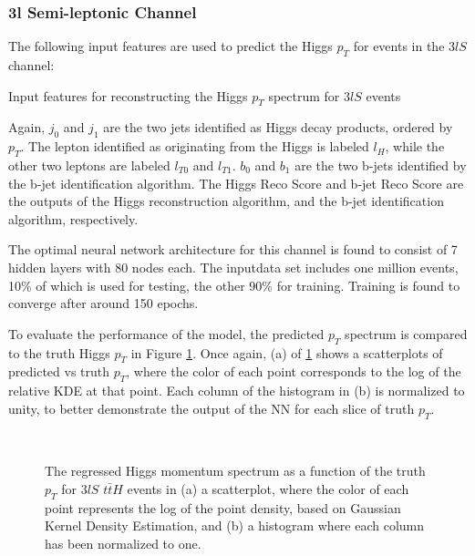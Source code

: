 
\subsubsection{3l Semi-leptonic Channel}
\label{subsec:pt3lS}

The following input features are used to predict the Higgs $p_T$ for events in the $3lS$ channel:

\begin{table}[H]

  \caption{Input features for reconstructing the Higgs $p_T$ spectrum for $3lS$ events}
  \label{tab:pt3lSfeatures}
\end{table}

Again, $j_0$ and $j_1$ are the two jets identified as Higgs decay products, ordered by $p_T$. The lepton identified as originating from the Higgs is labeled $l_H$, while the other two leptons are labeled $l_{T0}$ and $l_{T1}$. $b_0$ and $b_1$ are the two b-jets identified by the b-jet identification algorithm. The Higgs Reco Score and b-jet Reco Score are the outputs of the Higgs reconstruction algorithm, and the b-jet identification algorithm, respectively.

The optimal neural network architecture for this channel is found to consist of 7 hidden layers with 80 nodes each. The inputdata set includes one million events, 10\% of which is used for testing, the other 90\% for training. Training is found to converge after around 150 epochs.

To evaluate the performance of the model, the predicted $p_T$ spectrum is compared to the truth Higgs $p_T$ in Figure \ref{fig:pt3lSresults}. Once again, (a) of \ref{fig:pt3lSresults} shows a scatterplots of predicted vs truth $p_T$, where the color of each point corresponds to the log of the relative KDE at that point. Each column of the histogram in (b) is normalized to unity, to better demonstrate the output of the NN for each slice of truth $p_T$.
                                                                                                                             
\begin{figure}[H]
    \centering
    \\                     
    \caption{The regressed Higgs momentum spectrum as a function of the truth $p_T$ for $3lS$ $t\bar{t}H$ events in (a) a scatterplot, where the color of each point represents the log of the point density, based on Gaussian Kernel Density Estimation, and (b) a histogram where each column  has been normalized to one.}
    \label{fig:pt3lSresults}
\end{figure}

